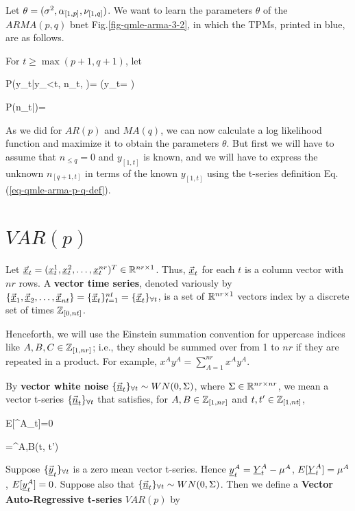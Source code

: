 Let $\theta=(\sigma^2,\alpha_{[1,p]}, \nu_{[1,q]})$.
We want to learn the parameters
$\theta$
of the $ARMA(p,q)$ bnet Fig.\ref{fig-qmle-arma-3-2},
in which the TPMs, printed in blue,
are as follows.

For $t\geq 
\max(p+1, q+1)$, let

\beq\color{blue}
P(y_t|y_{<t}, n_{\leq t}, \theta)=
\indi\left(y_t=
\right)
\eeq

\beq\color{blue}
P(n_t|\theta)=
{\s\sqrt{2\pi}}
\exp{}
\eeq


As we did for
$AR(p)$ and $MA(q)$,
we can  now calculate 
a log likelihood 
function and 
maximize it to obtain the 
parameters $\theta$.
But first we
will have to assume 
that $n_{\leq q}=0$
and $y_{[1,t]}$ is
known, 
and we will
have to express 
the unknown $n_{[q+1,t]}$
in terms of the known $y_{[1, t]}$
using the t-series definition
Eq.(\ref{eq-qmle-arma-p-q-def}).

\section{$VAR(p)$}
\label{sec-var-p}

Let
$\vec{{\underline{x}}}_t=({\underline{x}}_{t}^1, 
{\underline{x}}_{t}^2, \ldots, {\underline{x}}_t^{nr})^T
\in { \mathbb{R}}^{nr\times 1}$. Thus,
 $\vec{{\underline{x}}}_t$
for each $t$ is a
column vector with $nr$ rows.
A {\bf vector time series}, denoted 
variously by
$\{\vec{{\underline{x}}}_1, \vec{{\underline{x}}}_2, \ldots,
\vec{{\underline{x}}}_{nt}\}
=\{\vec{{\underline{x}}}_t\}_{t=1}^{nt}
={\{\vec{{\underline{x}}}_t\}_{\forall t}}$,
is a set of ${ \mathbb{R}}^{nr\times1}$ vectors
index by a discrete set of times ${\mathbb{Z}}_{[0, nt]}$.


Henceforth, we will use the Einstein
summation convention
for uppercase
indices like $A, B, C\in {\mathbb{Z}}_{[1,nr]}$; i.e.,
they should be summed over
from 1 to $nr$
if they are repeated in a product.
For example, $x^A y^A =\sum_{A=1}^{nr}x^A y^A$.

By {\bf vector white noise}
${\{\vec{{\underline{n}}}_t\}_{\forall t}}\sim WN(0, \Sigma)$,
where $\Sigma\in { \mathbb{R}}^{nr\times nr}$,
we mean a vector t-series
${\{\vec{{\underline{n}}}_t\}_{\forall t}}$ that satisfies, 
for
$A,B\in {\mathbb{Z}}_{[1,nr]}$ 
and $t,t'\in {\mathbb{Z}}_{[1,nt]}$,


\beq
E[\rvn^A_t]=0
\eeq

\beq
{}=\Sigma^{A,B}\delta(t, t')
\eeq

Suppose ${\{\vec{{\underline{y}}}_t\}_{\forall t}}$
is a zero mean vector
 t-series.
Hence
${\underline{y}}_t^A= {\underline{Y}}_t^A-\mu^A$, 
$E[{\underline{Y}}_t^A]=\mu^A$,
$E[{\underline{y}}_t^A]=0$.
Suppose also that 
${\{\vec{{\underline{n}}}_t\}_{\forall t}}\sim WN(0, \Sigma)$.
Then we define a
{\bf Vector
Auto-Regressive 
t-series} $VAR(p)$ by

